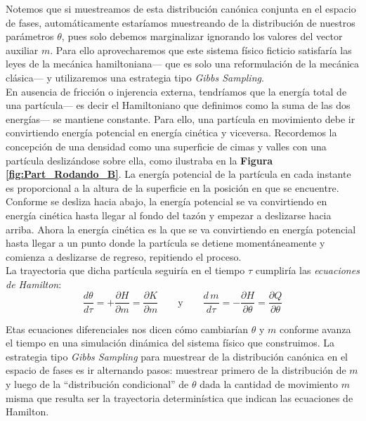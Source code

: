  Notemos que si muestreamos de esta distribución canónica conjunta en el espacio de fases, automáticamente estaríamos muestreando de la distribución de nuestros parámetros $\theta$, pues solo debemos marginalizar ignorando los valores del vector auxiliar $m$. Para ello aprovecharemos que este sistema físico ficticio satisfaría las leyes de la mecánica hamiltoniana--- que es solo una reformulación de la mecánica clásica--- y utilizaremos una estrategia tipo \textit{Gibbs Sampling}.\\ 
 
 En ausencia de fricción o injerencia externa, tendríamos que la energía total de una partícula--- es decir el Hamiltoniano que definimos como la suma de las dos energías--- se mantiene constante. Para ello, una partícula en movimiento debe ir convirtiendo energía potencial en energía cinética y viceversa. Recordemos la concepción de una densidad como una superficie de cimas y valles con una partícula deslizándose sobre ella, como ilustraba en la \textbf{Figura \ref{fig:Part_Rodando_B}}. La energía potencial de la partícula en cada instante es proporcional a la altura de la superficie en la posición en que se encuentre. Conforme se desliza hacia abajo, la energía potencial se va convirtiendo en energía cinética hasta llegar al fondo del tazón y empezar a deslizarse hacia arriba. Ahora la energía cinética es la que se va convirtiendo en energía potencial hasta llegar a un punto donde la partícula se detiene momentáneamente y comienza a deslizarse de regreso, repitiendo el proceso.\\ 
 
 La trayectoria que dicha partícula seguiría en el tiempo $\tau$ cumpliría las \textit{ecuaciones de Hamilton}: 
 \begin{equation}
 \label{eq:Ecuaciones_Hamilton}
 \dfrac{d\theta}{d\tau}=+\dfrac{\partial H}{\partial m} = \dfrac{\partial K}{\partial m} \qquad \text{y} \qquad \dfrac{d\,m}{d\tau}=-\dfrac{\partial H}{\partial \theta} = \dfrac{\partial Q}{\partial \theta}
 \end{equation}
 
 Etas ecuaciones diferenciales nos dicen cómo cambiarían $\theta$ y $m$ conforme avanza el tiempo en una simulación dinámica del sistema físico que construimos. La estrategia tipo \textit{Gibbs Sampling} para muestrear de la distribución canónica en el espacio de fases es ir alternando pasos: muestrear primero de la distribución de $m$ y luego de la ``distribución condicional'' de $\theta$ dada la cantidad de movimiento $m$ misma que resulta ser la trayectoria determinística que indican las ecuaciones de Hamilton.\\
 
